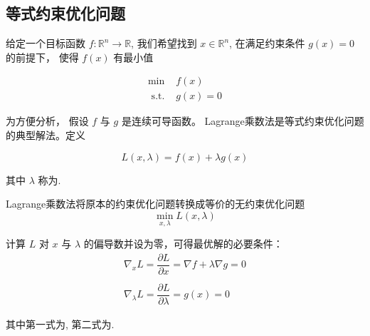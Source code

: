 \subsection{等式约束优化问题}

\begin{problem}[等式约束优化问题]
    给定一个目标函数 $ f: \mathbb{R}^{n} \rightarrow \mathbb{R} $, 我们希望找到 $ {x} \in \mathbb{R}^{n} $, 在满足约束条件 $ g({x})=0 $ 的前提下， 使得 $ f({x}) $ 有最小值

    \begin{equation}
\begin{array}{ll}
\min & f({x}) \\
\text { s.t. } & g({x})=0
\end{array}
\end{equation}
\end{problem}

为方便分析， 假设 $ f $ 与 $ g $ 是连续可导函数。 Lagrange乘数法是等式约束优化问题的典型解法。定义

\begin{definition}[Lagrangian函数]
    \begin{equation}
L({x}, \lambda)=f({x})+\lambda g({x})
\end{equation}
\end{definition}

其中 $ \lambda $ 称为. 

\begin{theorem}
    Lagrange乘数法将原本的约束优化问题转换成等价的无约束优化问题
\begin{equation}
\min _{{x}, \lambda} L({x}, \lambda)
\end{equation}
\end{theorem}

\begin{theorem}[拉格朗日乘子法最优解必要条件]
    计算 $ L $ 对 $ {x} $ 与 $ \lambda $ 的偏导数并设为零，可得最优解的必要条件：
\begin{equation}
\begin{array}{l}
\nabla_{{x}} L=\dfrac{\partial L}{\partial {x}}=\nabla f+\lambda \nabla g={0} \\
\\
\nabla_{\lambda} L=\dfrac{\partial L}{\partial \lambda}=g({x})=0
\end{array}
\end{equation}

其中第一式为, 第二式为.
\end{theorem}



